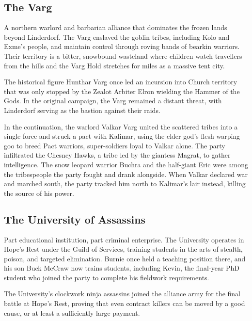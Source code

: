 \subsection*{The Varg}

A northern warlord and barbarian alliance that dominates the frozen lands beyond Linderdorf.  The Varg enslaved the goblin tribes, including Kolo and Exme's people, and maintain control through roving bands of bearkin warriors.  Their territory is a bitter, snowbound wasteland where children watch travellers from the hills and the Varg Hold stretches for miles as a massive tent city.

The historical figure Hunthar Varg once led an incursion into Church territory that was only stopped by the Zealot Arbiter Elron wielding the Hammer of the Gods.  In the original campaign, the Varg remained a distant threat, with Linderdorf serving as the bastion against their raids.

In the continuation, the warlord Valkar Varg united the scattered tribes into a single force and struck a pact with Kalimar, using the elder god's flesh-warping goo to breed Pact warriors, super-soldiers loyal to Valkar alone.  The party infiltrated the Chesney Hawks, a tribe led by the giantess Magrat, to gather intelligence.  The snow leopard warrior Buchra and the half-giant Eric were among the tribespeople the party fought and drank alongside.  When Valkar declared war and marched south, the party tracked him north to Kalimar's lair instead, killing the source of his power.

\smallskip

\subsection*{The University of Assassins}

Part educational institution, part criminal enterprise.  The University operates in Hope's Rest under the Guild of Services, training students in the arts of stealth, poison, and targeted elimination.  Burnie once held a teaching position there, and his son Buck McCraw now trains students, including Kevin, the final-year PhD student who joined the party to complete his fieldwork requirements.

The University's clockwork ninja assassins joined the alliance army for the final battle at Hope's Rest, proving that even contract killers can be moved by a good cause, or at least a sufficiently large payment.

\smallskip

